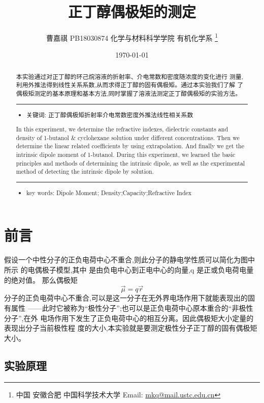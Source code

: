 \documentclass[11pt]{report}
\author{曹嘉祺 PB18030874 化学与材料科学学院 有机化学系 \thanks{中国 安徽合肥 中国科学技术大学 Email: \href{mailto:mkq@mail.ustc.edu.cn}{mkq@mail.ustc.edu.cn}}}
\date{\today}
\title{正丁醇偶极矩的测定}
\begin{document}
\maketitle
\tableofcontents

\begin{abstract}
 本实验通过对正丁醇的环己烷溶液的折射率、介电常数和密度随浓度的变化进行
测量,利用外推法得到线性关系系数,从而求得正丁醇的固有偶极矩。通过本实验我们了解
了偶极矩测定的基本原理和基本方法,同时掌握了溶液法测定正丁醇偶极矩的实验方法。


\noindent\rule{\textwidth}{0.5pt}
\begin{itemize}
\item 关键词: 正丁醇\quad 偶极矩\quad 折射率\quad 介电常数\quad 密度\quad 外推法\quad 线性相关系数
\end{itemize}
\end{abstract}
\begin{abstract}
In this experiment, we determine the refractive indexes, dielectric constants and
density of 1-butanol \& cyclohexane solution under different concentrations. Then we determine
the linear related coefficients by using extrapolation. And finally we get the intrinsic dipole
moment of 1-butanol. During this experiment, we learned the basic principles and methods of
determining the intrinsic dipole, as well as the experimental method of detecting the intrinsic
dipole by solution.

\noindent\rule{\textwidth}{0.5pt}

\begin{itemize}
\item key words: Dipole Moment; Density;Capacity;Refractive Index
\end{itemize}
\end{abstract}
\part{前言}
\label{sec:org336eb4a}
假设一个中性分子的正负电荷中心不重合,则此分子的静电学性质可以简化为图中所示
的电偶极子模型,其中 是由负电中心到正电中心的向量,q 是正或负电荷电量的绝对值。
那么偶极矩
\[
\vec{\mu}= q\vec{r}
\]
分子的正负电荷中心不重合,可以是这一分子在无外界电场作用下就能表现出的固有属性
——此时它被称为“极性分子”;也可以是正负电荷中心原本重合的“非极性分子”,在外
电场作用下发生了正负电荷中心的相互分离。因此偶极矩大小定量的表现出分子当前极性程
度的大小,本实验就是要测定极性分子正丁醇的固有偶极矩大小。
\chapter{实验原理}
\label{sec:org8cd4277}
\end{document}
